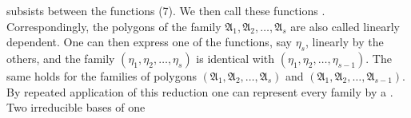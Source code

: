 subsists between the functions (7). We then call these functions
. Correspondingly, the polygons
of the family $\mathfrak{A}_1, \mathfrak{A}_2, \ldots, \mathfrak{A}_s$ are also called linearly dependent. One can then express one
of the functions, say $\eta_s$, linearly by the others,
and the family $(\eta_1, \eta_2, \ldots, \eta_s)$ is identical with $(\eta_1, \eta_2, \ldots, \eta_{s-1})$.
The same holds for the families of polygons $(\mathfrak{A}_1, \mathfrak{A}_2, \ldots, \mathfrak{A}_s)$ and $(\mathfrak{A}_1,
\mathfrak{A}_2, \ldots, \mathfrak{A}_{s-1})$. By repeated application of this reduction
one can represent every family by a . Two irreducible bases of one
